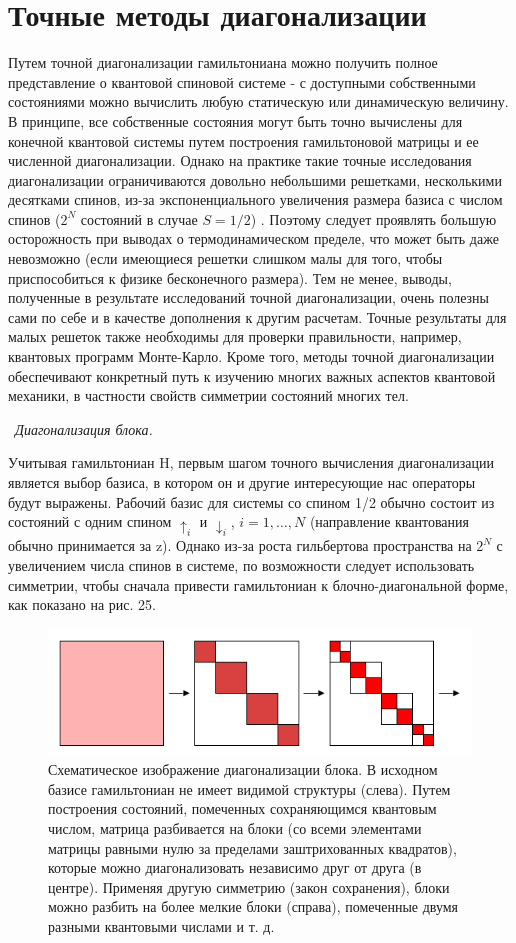 \documentclass[11pt]{article}
\begin{document}
\section{Точные методы диагонализации}
Путем точной диагонализации гамильтониана можно получить полное представление о квантовой спиновой системе - с доступными собственными состояниями можно вычислить любую статическую или динамическую величину. В принципе, все собственные состояния могут быть точно вычислены для конечной квантовой системы путем построения гамильтоновой матрицы и ее численной диагонализации. Однако на практике такие точные исследования диагонализации ограничиваются довольно небольшими решетками, несколькими десятками спинов, из-за экспоненциального увеличения размера базиса с числом спинов ($2^N$ состояний в случае $S = 1/2$) . Поэтому следует проявлять большую осторожность при выводах о термодинамическом пределе, что может быть даже невозможно (если имеющиеся решетки слишком малы для того, чтобы приспособиться к физике бесконечного размера). Тем не менее, выводы, полученные в результате исследований точной диагонализации, очень полезны сами по себе и в качестве дополнения к другим расчетам. Точные результаты для малых решеток также необходимы для проверки правильности, например, квантовых программ Монте-Карло. Кроме того, методы точной диагонализации обеспечивают конкретный путь к изучению многих важных аспектов квантовой механики, в частности свойств симметрии состояний многих тел.

~\emph{Диагонализация блока.}

Учитывая гамильтониан H, первым шагом точного вычисления диагонализации является выбор базиса, в котором он и другие интересующие нас операторы будут выражены. Рабочий базис для системы со спином 1/2 обычно состоит из состояний с одним спином $↑_i$ и $↓_i$, $i = 1,\dots, N$ (направление квантования обычно принимается за z). Однако из-за роста гильбертова пространства на $2^N$ с увеличением числа спинов в системе, по возможности следует использовать симметрии, чтобы сначала привести гамильтониан к блочно-диагональной форме, как показано на рис. 25. 

\begin{figure}[htp]
\centering
\includegraphics[scale=0.5]{fig25}
\caption{Схематическое изображение диагонализации блока. В исходном базисе гамильтониан не имеет видимой структуры (слева). Путем построения состояний, помеченных сохраняющимся квантовым числом, матрица разбивается на блоки (со всеми элементами матрицы равными нулю за пределами заштрихованных квадратов), которые можно диагонализовать независимо друг от друга (в центре). Применяя другую симметрию (закон сохранения), блоки можно разбить на более мелкие блоки (справа), помеченные двумя разными квантовыми числами и т. д.}
\label{}
\end{figure}
\end{document}
